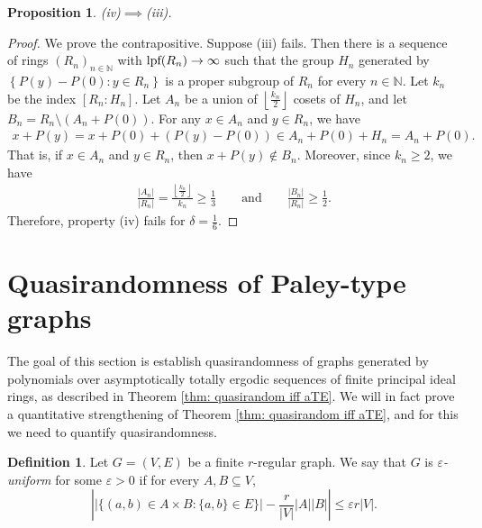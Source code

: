 \documentclass{amsart}
\newtheorem{proposition}[theorem]{Proposition}
\theoremstyle{definition}
\newtheorem{definition}[theorem]{Definition}
\numberwithin{equation}{section}
\newcommand{\N}{\mathbb{N}}
\newcommand{\eps}{\varepsilon}
\newcommand{\lpf}{\normalfont\text{lpf}}
\newcommand{\floor}[1]{\left\lfloor #1 \right\rfloor}
\begin{document}
\begin{proposition} \label{prop: iv,iii}
	(iv)$\implies$(iii).
\end{proposition}
\begin{proof}
	We prove the contrapositive.
	Suppose (iii) fails.
	Then there is a sequence of rings $(R_n)_{n \in \N}$ with $\lpf(R_n) \to \infty$ such that the group $H_n$ generated by $\left\{ P(y) - P(0) : y \in R_n \right\}$ is a proper subgroup of $R_n$ for every $n \in \N$.
    Let $k_n$ be the index $[R_n : H_n]$.
	Let $A_n$ be a union of $\floor{\frac{k_n}{2}}$ cosets of $H_n$,
	and let $B_n = R_n \setminus \left( A_n + P(0) \right)$.
	For any $x \in A_n$ and $y \in R_n$, we have
	\begin{align*}
		x + P(y) = x + P(0) + (P(y) - P(0)) \in A_n + P(0) + H_n = A_n + P(0).
	\end{align*}
	That is, if $x \in A_n$ and $y \in R_n$, then $x + P(y) \notin B_n$.
	Moreover, since $k_n \ge 2$, we have
	\begin{align*}
		\frac{|A_n|}{|R_n|} = \frac{\floor{\frac{k_n}{2}}}{k_n} \ge \frac{1}{3} \qquad \text{and} \qquad
		 \frac{|B_n|}{|R_n|} \ge \frac{1}{2}.
	\end{align*}
	Therefore, property (iv) fails for $\delta = \frac{1}{6}$.
\end{proof}


\section{Quasirandomness of Paley-type graphs} \label{sec:quasirandomness}

The goal of this section is establish quasirandomness of graphs generated by polynomials over asymptotically totally ergodic sequences of finite principal ideal rings, as described in Theorem \ref{thm: quasirandom iff aTE}.
We will in fact prove a quantitative strengthening of Theorem \ref{thm: quasirandom iff aTE}, and for this we need to quantify quasirandomness.

\begin{definition}
    Let $G = (V, E)$ be a finite $r$-regular graph.
    We say that $G$ is \emph{$\eps$-uniform} for some $\eps > 0$ if for every $A, B \subseteq V$,
    \begin{equation*}
        \left| \left| \{(a,b) \in A \times B : \{a,b\} \in E\} \right| - \frac{r}{|V|} |A| |B| \right| \leq \eps r |V|.
    \end{equation*}
\end{definition}
\end{document}
